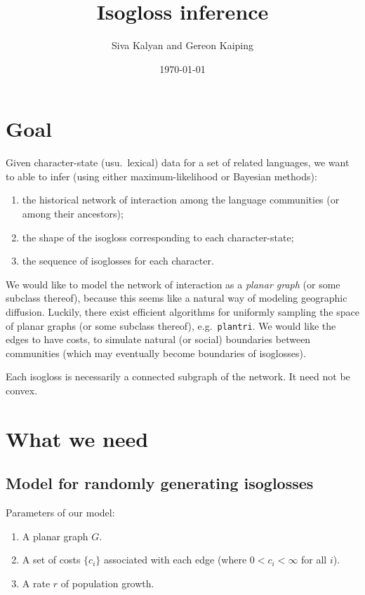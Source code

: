 \documentclass[12pt,onecolumn]{article}
\author{Siva Kalyan and Gereon Kaiping}
\date{\today}
\title{Isogloss inference}
\begin{document}
\maketitle
\tableofcontents


\section{Goal}
\label{sec:org8f7cfdc}
Given character-state (usu.~lexical) data for a set of related languages, we want to able to infer (using either maximum-likelihood or Bayesian methods):
\begin{enumerate}
\item the historical network of interaction among the language communities (or among their ancestors);
\item the shape of the isogloss corresponding to each character-state;
\item the sequence of isoglosses for each character.
\end{enumerate}

We would like to model the network of interaction as a \emph{planar graph} (or some subclass thereof), because this seems like a natural way of modeling geographic diffusion. Luckily, there exist efficient algorithms for uniformly sampling the space of planar graphs (or some subclass thereof), e.g.~\texttt{plantri}. We would like the edges to have costs, to simulate natural (or social) boundaries between communities (which may eventually become boundaries of isoglosses).

Each isogloss is necessarily a connected subgraph of the network. It need not be convex.
\section{What we need}
\label{sec:org551e8e0}
\subsection{Model for randomly generating isoglosses}
\label{sec:org0a797ce}
Parameters of our model:
\begin{enumerate}
\item A planar graph \(G\).
\item A set of costs \(\{c_i\}\) associated with each edge (where \(0 < c_i < \infty\) for all \(i\)).
\item A rate \(r\) of population growth.
\end{enumerate}
\end{document}
